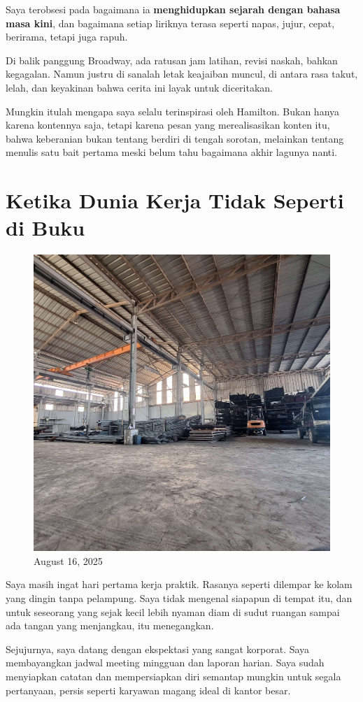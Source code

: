 \documentclass[
  letterpaper,
  DIV=11,
  numbers=noendperiod]{scrreprt}
\begin{document}
Saya terobsesi pada bagaimana ia \textbf{menghidupkan sejarah dengan
bahasa masa kini}, dan bagaimana setiap liriknya terasa seperti napas,
jujur, cepat, berirama, tetapi juga rapuh.

Di balik panggung Broadway, ada ratusan jam latihan, revisi naskah,
bahkan kegagalan. Namun justru di sanalah letak keajaiban muncul, di
antara rasa takut, lelah, dan keyakinan bahwa cerita ini layak untuk
diceritakan.

Mungkin itulah mengapa saya selalu terinspirasi oleh Hamilton. Bukan
hanya karena kontennya saja, tetapi karena pesan yang merealisasikan
konten itu, bahwa keberanian bukan tentang berdiri di tengah sorotan,
melainkan tentang menulis satu bait pertama meski belum tahu bagaimana
akhir lagunya nanti.

\section{Ketika Dunia Kerja Tidak Seperti di
Buku}\label{ketika-dunia-kerja-tidak-seperti-di-buku}

\begin{figure}[H]

{\centering \includegraphics[width=0.5\linewidth,height=\textheight,keepaspectratio]{My_Stories_for_You/../images/gudang.jpg}

}

\caption{August 16, 2025}

\end{figure}%

Saya masih ingat hari pertama kerja praktik. Rasanya seperti dilempar ke
kolam yang dingin tanpa pelampung. Saya tidak mengenal siapapun di
tempat itu, dan untuk seseorang yang sejak kecil lebih nyaman diam di
sudut ruangan sampai ada tangan yang menjangkau, itu menegangkan.

Sejujurnya, saya datang dengan ekspektasi yang sangat korporat. Saya
membayangkan jadwal meeting mingguan dan laporan harian. Saya sudah
menyiapkan catatan dan mempersiapkan diri semantap mungkin untuk segala
pertanyaan, persis seperti karyawan magang ideal di kantor besar.
\end{document}
